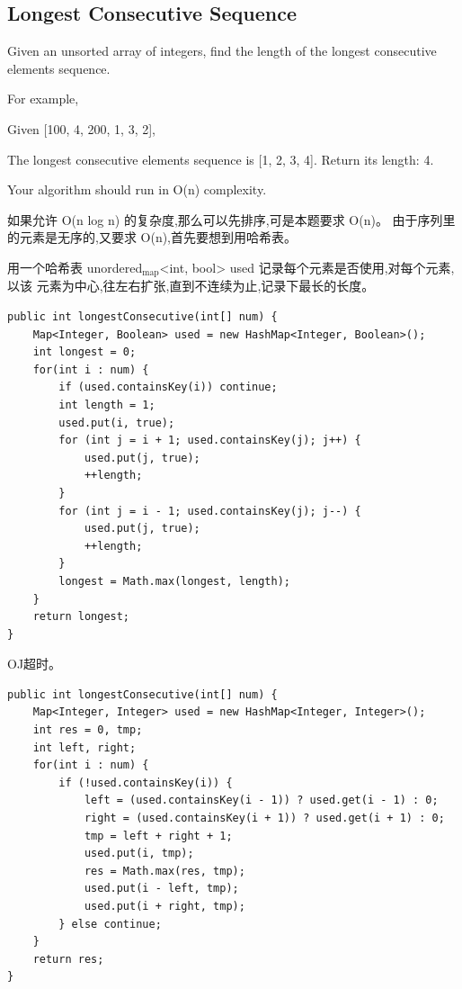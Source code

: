 \documentclass[12pt]{book}
\begin{document}
\subsection{Longest Consecutive Sequence}
\label{sec-1-3-3}
Given an unsorted array of integers, find the length of the longest consecutive elements sequence.

For example,

Given [100, 4, 200, 1, 3, 2],

The longest consecutive elements sequence is [1, 2, 3, 4]. Return its length: 4.

Your algorithm should run in O(n) complexity.

如果允许 O(n log n) 的复杂度,那么可以先排序,可是本题要求 O(n)。
由于序列里的元素是无序的,又要求 O(n),首先要想到用哈希表。

用一个哈希表 unordered$_{\text{map}}$<int, bool> used 记录每个元素是否使用,对每个元素,以该
元素为中心,往左右扩张,直到不连续为止,记录下最长的长度。

\lstset{language=java,label= ,caption= ,numbers=none}
\begin{lstlisting}
public int longestConsecutive(int[] num) {
    Map<Integer, Boolean> used = new HashMap<Integer, Boolean>();
    int longest = 0;
    for(int i : num) {
        if (used.containsKey(i)) continue;
        int length = 1;
        used.put(i, true);
        for (int j = i + 1; used.containsKey(j); j++) {
            used.put(j, true);
            ++length;
        }
        for (int j = i - 1; used.containsKey(j); j--) {
            used.put(j, true);
            ++length;
        }
        longest = Math.max(longest, length);
    }
    return longest;
}
\end{lstlisting}

OJ超时。

\lstset{language=java,label= ,caption= ,numbers=none}
\begin{lstlisting}
public int longestConsecutive(int[] num) {
    Map<Integer, Integer> used = new HashMap<Integer, Integer>();
    int res = 0, tmp;
    int left, right;
    for(int i : num) {
        if (!used.containsKey(i)) {
            left = (used.containsKey(i - 1)) ? used.get(i - 1) : 0;
            right = (used.containsKey(i + 1)) ? used.get(i + 1) : 0;
            tmp = left + right + 1;
            used.put(i, tmp);
            res = Math.max(res, tmp);
            used.put(i - left, tmp);
            used.put(i + right, tmp);
        } else continue;
    }
    return res;
}
\end{lstlisting}
\end{document}
